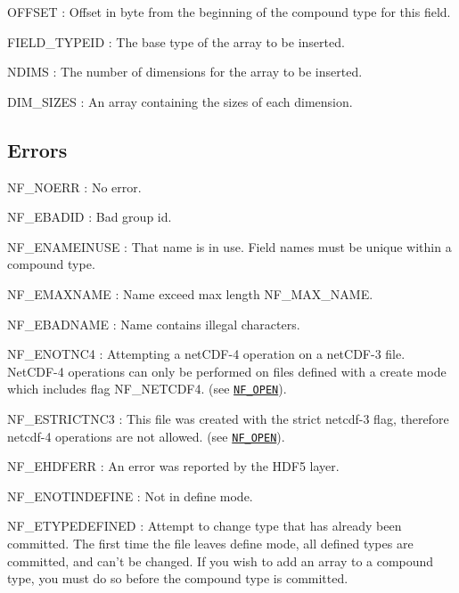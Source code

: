{\ttfamily O\+F\+F\+S\+ET} \+: Offset in byte from the beginning of the compound type for this field.

{\ttfamily F\+I\+E\+L\+D\+\_\+\+T\+Y\+P\+E\+ID} \+: The base type of the array to be inserted.

{\ttfamily N\+D\+I\+MS} \+: The number of dimensions for the array to be inserted.

{\ttfamily D\+I\+M\+\_\+\+S\+I\+Z\+ES} \+: An array containing the sizes of each dimension.

\subsection*{Errors }

{\ttfamily N\+F\+\_\+\+N\+O\+E\+RR} \+: No error.

{\ttfamily N\+F\+\_\+\+E\+B\+A\+D\+ID} \+: Bad group id.

{\ttfamily N\+F\+\_\+\+E\+N\+A\+M\+E\+I\+N\+U\+SE} \+: That name is in use. Field names must be unique within a compound type.

{\ttfamily N\+F\+\_\+\+E\+M\+A\+X\+N\+A\+ME} \+: Name exceed max length N\+F\+\_\+\+M\+A\+X\+\_\+\+N\+A\+ME.

{\ttfamily N\+F\+\_\+\+E\+B\+A\+D\+N\+A\+ME} \+: Name contains illegal characters.

{\ttfamily N\+F\+\_\+\+E\+N\+O\+T\+N\+C4} \+: Attempting a net\+C\+D\+F-\/4 operation on a net\+C\+D\+F-\/3 file. Net\+C\+D\+F-\/4 operations can only be performed on files defined with a create mode which includes flag N\+F\+\_\+\+N\+E\+T\+C\+D\+F4. (see \href{#NF_005fOPEN}{\tt N\+F\+\_\+\+O\+P\+EN}).

{\ttfamily N\+F\+\_\+\+E\+S\+T\+R\+I\+C\+T\+N\+C3} \+: This file was created with the strict netcdf-\/3 flag, therefore netcdf-\/4 operations are not allowed. (see \href{#NF_005fOPEN}{\tt N\+F\+\_\+\+O\+P\+EN}).

{\ttfamily N\+F\+\_\+\+E\+H\+D\+F\+E\+RR} \+: An error was reported by the H\+D\+F5 layer.

{\ttfamily N\+F\+\_\+\+E\+N\+O\+T\+I\+N\+D\+E\+F\+I\+NE} \+: Not in define mode.

{\ttfamily N\+F\+\_\+\+E\+T\+Y\+P\+E\+D\+E\+F\+I\+N\+ED} \+: Attempt to change type that has already been committed. The first time the file leaves define mode, all defined types are committed, and can’t be changed. If you wish to add an array to a compound type, you must do so before the compound type is committed.

